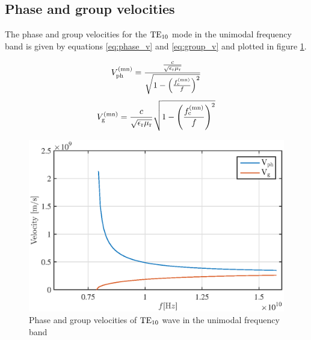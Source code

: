 \subsection{Phase and group velocities}
The phase and group velocities for the $\rm TE_{10}$ mode in the unimodal frequency band is given by equations \ref{eq:phase_v} and \ref{eq:group_v} and plotted in figure \ref{fig:velocity}.

\begin{equation}
V_{\rm ph}^{\rm (mn)} = \frac{\frac{c}{\sqrt{\epsilon_{\rm r} \mu_{\rm r}}}}{\sqrt{1-\left(\frac{f_{\rm c}^{\rm (mn)}}{f}\right)^2}}
\label{eq:phase_v}
\end{equation}
\begin{equation}
V_{\rm g}^{\rm (mn)} = \frac{c}{\sqrt{\epsilon_{\rm r} \mu_{\rm r}}}{\sqrt{1-\left(\frac{f_{\rm c}^{\rm (mn)}}{f}\right)^2}}
\label{eq:group_v}
\end{equation}
\begin{figure}[h t b p]
\centering
\includegraphics[width=\textwidth,keepaspectratio]{figures/velocity.eps}
\caption{Phase and group velocities of ${\rm TE}_{\rm 10}$ wave in the unimodal frequency band}
\label{fig:velocity}
\end{figure}